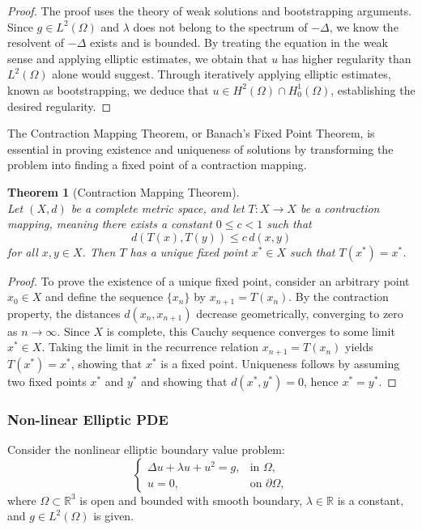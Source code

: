 \documentclass[12pt, reqno]{amsart}
\newtheorem{theorem}{Theorem}[section]
\theoremstyle{definition}
\numberwithin{equation}{section}
\begin{document}
\begin{proof}
The proof uses the theory of weak solutions and bootstrapping arguments. Since \( g \in L^2(\Omega) \) and \( \lambda \) does not belong to the spectrum of \( -\Delta \), we know the resolvent of \( -\Delta \) exists and is bounded. By treating the equation in the weak sense and applying elliptic estimates, we obtain that \( u \) has higher regularity than \( L^2(\Omega) \) alone would suggest. Through iteratively applying elliptic estimates, known as bootstrapping, we deduce that \( u \in H^2(\Omega) \cap H_0^1(\Omega) \), establishing the desired regularity.
\end{proof}

The Contraction Mapping Theorem, or Banach's Fixed Point Theorem, is essential in proving existence and uniqueness of solutions by transforming the problem into finding a fixed point of a contraction mapping.
\begin{theorem}[Contraction Mapping Theorem] \hfill \\
Let \( (X, d) \) be a complete metric space, and let \( T : X \rightarrow X \) be a contraction mapping, meaning there exists a constant \( 0 \leq c < 1 \) such that
\[
d(T(x), T(y)) \leq c \, d(x, y)
\]
for all \( x, y \in X \). Then \( T \) has a unique fixed point \( x^* \in X \) such that \( T(x^*) = x^* \).
\end{theorem}

\begin{proof}
To prove the existence of a unique fixed point, consider an arbitrary point \( x_0 \in X \) and define the sequence \( \{ x_n \} \) by \( x_{n+1} = T(x_n) \). By the contraction property, the distances \( d(x_n, x_{n+1}) \) decrease geometrically, converging to zero as \( n \to \infty \). Since \( X \) is complete, this Cauchy sequence converges to some limit \( x^* \in X \). Taking the limit in the recurrence relation \( x_{n+1} = T(x_n) \) yields \( T(x^*) = x^* \), showing that \( x^* \) is a fixed point. Uniqueness follows by assuming two fixed points \( x^* \) and \( y^* \) and showing that \( d(x^*, y^*) = 0 \), hence \( x^* = y^* \).
\end{proof}
\subsubsection{Non-linear Elliptic PDE}
Consider the nonlinear elliptic boundary value problem:
\[
\begin{cases}
\Delta u + \lambda u + u^2 = g, & \text{in } \Omega, \\
u = 0, & \text{on } \partial \Omega,
\end{cases}
\]
where \( \Omega \subset \mathbb{R}^3 \) is open and bounded with smooth boundary, \( \lambda \in \mathbb{R} \) is a constant, and \( g \in L^2(\Omega) \) is given.
\end{document}
